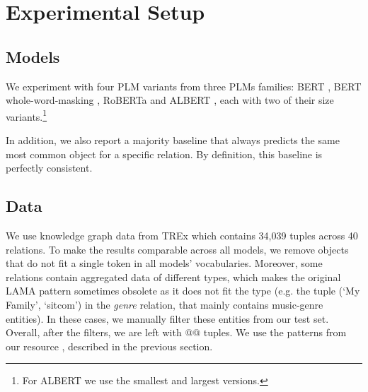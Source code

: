 \section{Experimental Setup}
\label{sec:setup}

\subsection{Models}
We experiment with four PLM variants from three PLMs families: BERT \cite{bert}, BERT whole-word-masking , RoBERTa \cite{roberta} and ALBERT \cite{albert}, each with two of their  size variants.\footnote{For ALBERT we use the smallest and largest versions.}

In addition, we also report a majority baseline that always predicts the same most common object for a specific relation. By definition, this baseline is perfectly consistent.

\subsection{Data}



We use knowledge graph data from TREx \cite{trex} which contains 34,039 tuples across 40 relations. To make the results comparable across all models, we remove objects that do not fit a single token in all models' vocabularies. Moreover, some relations contain aggregated data of different types, which makes the original LAMA pattern sometimes obsolete as it does not fit the type (e.g. the tuple (`My Family', `sitcom') in the \textit{genre} relation, that mainly contains music-genre entities). In these cases, we manually filter these entities from our test set.
Overall, after the filters, we are left with @@ tuples.
We use the patterns from our resource \resource{}, described in the previous section. 


